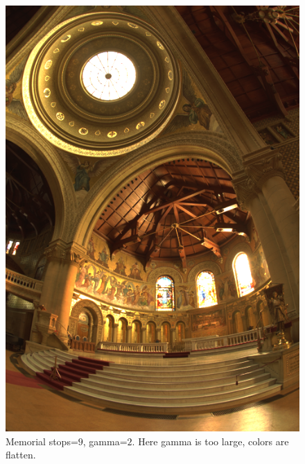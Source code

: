 \documentclass[a4paper,12pt,oneside,final]{report}
\begin{document}
\begin{figure}[!h]
\centering
\includegraphics[scale=0.8]{pictures/stops_9_gamma_2.png}
\caption{Memorial stops=$9$, gamma=$2$. Here gamma is too large, colors are flatten.}
\end{figure}
\end{document}
